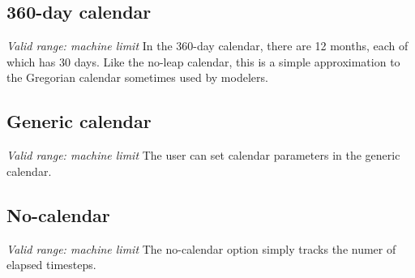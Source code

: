 \subsection{360-day calendar}
{\it Valid range: machine limit}
In the 360-day calendar, there are 12 months, each of which has 30 days.  
Like the no-leap calendar, this is a simple approximation to the Gregorian
calendar sometimes used by modelers.

\subsection{Generic calendar}
{\it Valid range: machine limit}
The user can set calendar parameters in the generic calendar.

\subsection{No-calendar}
{\it Valid range: machine limit}
The no-calendar option simply tracks the numer of elapsed timesteps.




